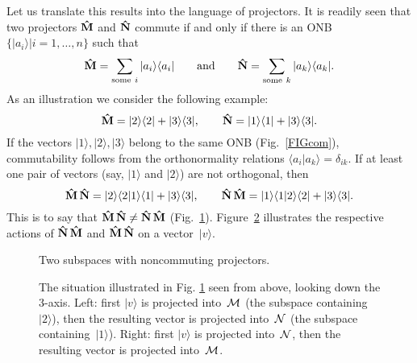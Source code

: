 \documentclass[12pt]{article}
\newcommand{\bra}[1]{\langle#1\vert}
\newcommand{\ket}[1]{\vert#1\rangle}
\newcommand{\braket}[2]{\langle#1\vert#2\rangle}
\newcommand{\ketbra}[2]{\vert#1\rangle\langle#2\vert}
\newcommand{\be}{\begin{equation}}
\newcommand{\ee}{\end{equation}}
\newcommand{\cM}{{\cal M}}
\newcommand{\cN}{{\cal N}}
\newcommand{\hM}{{\bf\hat M}}
\newcommand{\hN}{{\bf\hat N}}
\begin{document}
Let us translate this results into the language of projectors. It is readily seen that two projectors $\hM$ and $\hN$ commute if and only if there is an ONB $\{\ket{a_i}|i=1,\dots,n\}$ such that
\be
\hM=\sum_{\hbox{{\scriptsize some} }i}\ketbra{a_i}{a_i}\qquad\hbox{and}\qquad
\hN=\sum_{\hbox{{\scriptsize some} }k}\ketbra{a_k}{a_k}.
\label{commonbasis}
\ee
As an illustration we consider the following example:
\be
\hM=\ketbra22+\ketbra33,\qquad \hN=\ketbra11+\ketbra33.
\ee
If the vectors $\ket1,\ket2,\ket3$ belong to the same ONB (Fig.~\ref{FIGcom}), commutability follows from the orthonormality relations $\braket{a_i}{a_k}=\delta_{ik}$. If at least one pair of vectors (say, $\ket1$ and $\ket2$) are not orthogonal, then
\be
\hM\,\hN=\ket2\braket21\bra1+\ketbra33,\qquad \hN\,\hM=\ket1\braket12\bra2+\ketbra33.
\ee
This is to say that $\hM\,\hN\neq\hN\,\hM$ (Fig.~\ref{FIGnoncom}). Figure~\ref{FIGncvecs} illustrates the respective actions of $\hN\,\hM$ and $\hM\,\hN$ on a vector~$\ket v$.
\begin{figure}[t]
\begin{center}
\end{center}
\caption{Two subspaces with noncommuting projectors.}
\label{FIGnoncom}
\end{figure}
\begin{figure}[t]
\begin{center}
\end{center}
\caption{The situation illustrated in Fig. \ref{FIGnoncom} seen from above, looking down the 3-axis. Left: first $\ket v$ is projected into~$\cM$ (the subspace containing~$\ket2$), then the resulting vector is projected into~$\cN$ (the subspace containing~$\ket1$). Right: first $\ket v$ is projected into~$\cN$, then the resulting vector is projected into~$\cM$.}
\label{FIGncvecs}
\end{figure}
\end{document}

